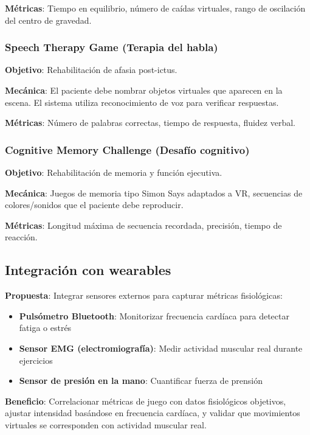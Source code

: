 \textbf{Métricas}: Tiempo en equilibrio, número de caídas virtuales, rango de oscilación del centro de gravedad.

\subsubsection{Speech Therapy Game (Terapia del habla)}

\textbf{Objetivo}: Rehabilitación de afasia post-ictus.

\textbf{Mecánica}: El paciente debe nombrar objetos virtuales que aparecen en la escena. El sistema utiliza reconocimiento de voz para verificar respuestas.

\textbf{Métricas}: Número de palabras correctas, tiempo de respuesta, fluidez verbal.

\subsubsection{Cognitive Memory Challenge (Desafío cognitivo)}

\textbf{Objetivo}: Rehabilitación de memoria y función ejecutiva.

\textbf{Mecánica}: Juegos de memoria tipo Simon Says adaptados a VR, secuencias de colores/sonidos que el paciente debe reproducir.

\textbf{Métricas}: Longitud máxima de secuencia recordada, precisión, tiempo de reacción.

\subsection{Integración con wearables}

\textbf{Propuesta}: Integrar sensores externos para capturar métricas fisiológicas:

\begin{itemize}
    \item \textbf{Pulsómetro Bluetooth}: Monitorizar frecuencia cardíaca para detectar fatiga o estrés
    \item \textbf{Sensor EMG (electromiografía)}: Medir actividad muscular real durante ejercicios
    \item \textbf{Sensor de presión en la mano}: Cuantificar fuerza de prensión
\end{itemize}

\textbf{Beneficio}: Correlacionar métricas de juego con datos fisiológicos objetivos, ajustar intensidad basándose en frecuencia cardíaca, y validar que movimientos virtuales se corresponden con actividad muscular real.

